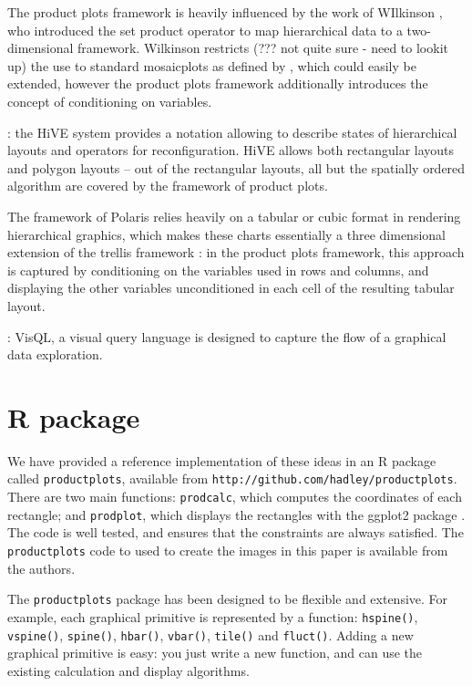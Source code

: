 \documentclass[journal]{vgtc}
\begin{document}
The product plots framework is heavily influenced by the work of WIlkinson \citep{wilkinson:1999, wilkinson:2005}, who introduced the set product operator to map hierarchical data to a two-dimensional framework.  Wilkinson restricts (??? not quite sure - need to lookit up) the use to standard mosaicplots as defined by \citet{hartigan:1981}, which could easily be extended, however the product plots framework additionally introduces the concept of conditioning on variables.

 \citep{slingsby:2009}: the HiVE system provides a notation allowing to describe states of hierarchical layouts and operators for reconfiguration. HiVE allows both rectangular layouts and polygon layouts -- out of the rectangular layouts, all but the spatially ordered algorithm are covered by the  framework of product plots.
 
The framework of  Polaris  \cite{stolte:2002} relies heavily on a tabular or cubic format in rendering hierarchical graphics, which makes these charts essentially a three dimensional extension of the trellis framework \citep{cleveland:1994, cleveland:1996}:  in the product plots framework, this approach is captured by conditioning on the variables used in rows and columns, and displaying the other variables unconditioned in each cell of the resulting tabular layout.

 \cite{mackinlay:1986, mackinlay2007}: VisQL, a visual query language is designed to capture the flow of a graphical data exploration. 
 

\section{R package}
\label{sec:package}

We have provided a reference implementation of these ideas in an R \citep{R} package called {\tt productplots}, available from {\tt http://github.com/hadley/productplots}. There are two main functions: {\tt prodcalc}, which computes the coordinates of each rectangle; and {\tt prodplot}, which displays the rectangles with the ggplot2 package \citep{me:ggplot2}. The code is well tested, and ensures that the constraints are always satisfied. The {\tt productplots} code to used to create the images in this paper is available from the authors.

The {\tt productplots} package has been designed to be flexible and extensive.  For example, each graphical primitive is represented by a function: {\tt hspine()}, {\tt vspine()}, {\tt spine()}, {\tt hbar()}, {\tt vbar()}, {\tt tile()} and {\tt fluct()}. Adding a new graphical primitive is easy: you just write a new function, and can use the existing calculation and display algorithms.
\end{document}
